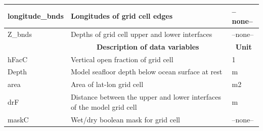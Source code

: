 \begin{longtable}{|m{}|m{}|m{}|}
longitude\_bnds &Longitudes of grid cell edges &--none--  \\ \hline
Z\_bnds &Depths of grid cell upper and lower interfaces &--none--  \\ \hline
\rowcolor{lightgray} \multicolumn{1}{|c|}{\textbf{Variables}} & \multicolumn{1}{|c|}{\textbf{Description of data variables}} & \multicolumn{1}{|c|}{\textbf{Unit}}\\ \hline
hFacC &Vertical open fraction of grid cell &1  \\ \hline
Depth &Model seafloor depth below ocean surface at rest &m  \\ \hline
area &Area of lat-lon grid cell &m2  \\ \hline
drF &Distance between the upper and lower interfaces of the model grid cell &m  \\ \hline
maskC &Wet/dry boolean mask for grid cell &--none--  \\ \hline
\end{longtable}

\newp
\pagebreak
